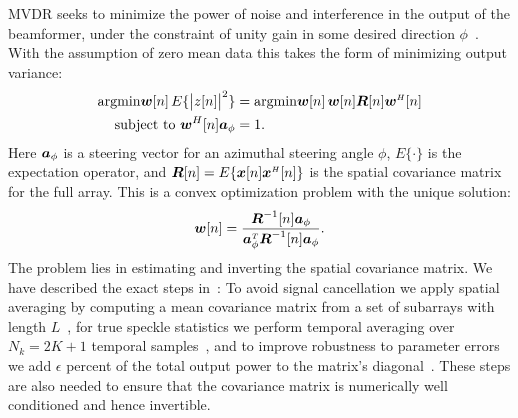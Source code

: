 MVDR seeks to minimize the power of noise and interference in the output of the beamformer, under the constraint of unity gain in some desired direction $\phi$~\cite{Capon1969}. With the assumption of zero mean data this takes the form of minimizing output variance: 
%
\begin{align}
\argmin{\w[n]}\, E\{\big|z[n]\big|^2\} &= \argmin{\w[n]}\, \w[n]\R[n]\w\H[n]\nn
\text{subject to } \w^H[n]\a_\phi &= 1.\label{III_eq:mvdr_definition}
\end{align}
%
Here $\boldsymbol{a}_\phi$ is a steering vector for an azimuthal steering angle $\phi$, $E\{\cdot\}$ is the expectation operator, and $\boldsymbol{R}[n] = E\{\boldsymbol{x}[n]\boldsymbol{x}^{\scriptscriptstyle H}[n]\}$ is the spatial covariance matrix for the full array. This is a convex optimization problem with the unique solution:
%
\begin{gather}
\vec w[n] = \frac{\Ri[n]\a_\phi}{\a_\phi\T\Ri[n]\a_\phi}.\label{III_eq:mvdr_weights}
\end{gather}
The problem lies in estimating and inverting the spatial covariance matrix. We have described the exact steps in~\cite{Buskenes2014}: To avoid signal cancellation we apply spatial averaging by computing a mean covariance matrix from a set of subarrays with length $L$~\cite{Kailath1985}, for true speckle statistics we perform temporal averaging over $N_k = 2K+1$ temporal samples~\cite{Synnevag2009}, and to improve robustness to parameter errors we add {\large$\epsilon$} percent of the total output power to the matrix's diagonal~\cite{Cox1987,Maksym1979}. These steps are also needed to ensure that the covariance matrix is numerically well conditioned and hence invertible.

